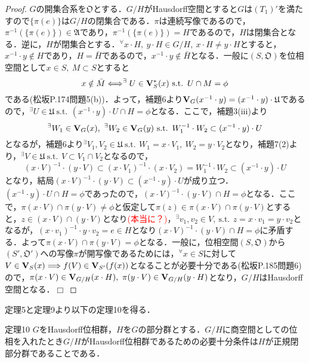 \documentclass[a4paper,11pt]{jsarticle}
\newtheorem{proof}{証明}
\def\qed{\hfill $\Box$}
\newcommand{\st}{\mathrm{s.t.}\,}  %
\begin{document}
\begin{proof}
$G$の開集合系を$\mathfrak{O}$とする．$G/H$がHausdorff空間とすると$G$は$(T_1)'$を満たすので$\{\pi(e)\}$は$G/H$の閉集合である．$\pi$は連続写像であるので，$\pi^{-1}(\{\pi(e)\})\in\mathfrak{A}$であり，$\pi^{-1}(\{\pi(e)\})=H$であるので，$H$は閉集合となる．逆に，$H$が閉集合とする．$^\forall x\cdot H,{\ }y\cdot H\in G/H,{\ }x\cdot H\neq y\cdot H$とすると，$x^{-1}\cdot y\notin H$であり，$H=\bar{H}$であるので，$x^{-1}\cdot y\notin \bar{H}$となる．一般に$(S,\mathfrak{O})$を位相空間として$x\in S,{\ }M\subset S$とすると
\begin{equation*}
x\notin \bar{M} \Longleftrightarrow ^\exists U\in {\bf V}_S^\ast(x){\ }\st{\ }U\cap M=\phi
\end{equation*}
である(松坂P.174問題5(b))．よって，補題6より${\bf V}_G(x^{-1}\cdot y)=(x^{-1}\cdot y)\cdot\mathfrak{U}$であるので，$^\exists U\in\mathfrak{U}{\ }\st{\ }(x^{-1}\cdot y)\cdot U\cap H=\phi$となる．ここで，補題3(iii)より
\begin{equation*}
^\exists W_1\in{\bf V}_G(x),{\ } ^\exists W_2\in{\bf V}_G(y){\ }\st{\ }W_1^{-1}\cdot W_2\subset (x^{-1}\cdot y)\cdot U
\end{equation*}
となるが，補題6より$^\exists V_1,V_2\in\mathfrak{U}{\ }\st{\ }W_1=x\cdot V_1,{\ }W_2=y\cdot V_2$となり，補題7(2)より，$^\exists V\in\mathfrak{U}{\ }\st{\ }V\subset V_1\cap V_2$となるので，
\begin{equation*}
(x\cdot V)^{-1}\cdot(y\cdot V)\subset (x\cdot V_1)^{-1}\cdot(x\cdot V_2)=W_1^{-1}\cdot W_2\subset (x^{-1}\cdot y)\cdot U
\end{equation*}
となり，結局$(x\cdot V)^{-1}\cdot(y\cdot V)\subset (x^{-1}\cdot y)\cdot U$が成り立つ．$(x^{-1}\cdot y)\cdot U\cap H=\phi$であったので，$(x\cdot V)^{-1}\cdot(y\cdot V)\cap H=\phi$となる．ここで，$\pi(x\cdot V)\cap \pi(y\cdot V)\neq \phi$と仮定して$\pi(z)\in\pi(x\cdot V)\cap \pi(y\cdot V)$とすると，$z\in (x\cdot V)\cap(y\cdot V)$となり\textcolor{red}{(本当に？)}，$^\exists v_1,v_2\in V,{\ }\st{\ }z=x\cdot v_1=y\cdot v_2$となるが，$(x\cdot v_1)^{-1}\cdot y\cdot v_2=e\in H$となり$(x\cdot V)^{-1}\cdot(y\cdot V)\cap H=\phi$に矛盾する．よって$\pi(x\cdot V)\cap \pi(y\cdot V)=\phi$となる．一般に，位相空間$(S,\mathfrak{O})$から$(S',\mathfrak{O}')$への写像$\pi$が開写像であるためには，$^\forall x\in S$に対して$V\in{\bf V}_S(x)\Longrightarrow f(V)\in {\bf V}_{S'}(f(x))$となることが必要十分である(松坂P.185問題6)ので，$\pi(x\cdot V)\in {\bf V}_{G/H}(x\cdot H),{\ }\pi(y\cdot V)\in {\bf V}_{G/H}(y\cdot H)$となり，$G/H$はHausdorff空間となる．\qed
\end{proof}
定理5と定理9より以下の定理10を得る．
\begin{itembox}[l]{定理10}
$G$をHausdorff位相群，$H$を$G$の部分群とする．$G/H$に商空間としての位相を入れたとき$G/H$がHausdorff位相群であるための必要十分条件は$H$が正規閉部分群であることである．
\end{itembox}
%
%
%
\end{document}
